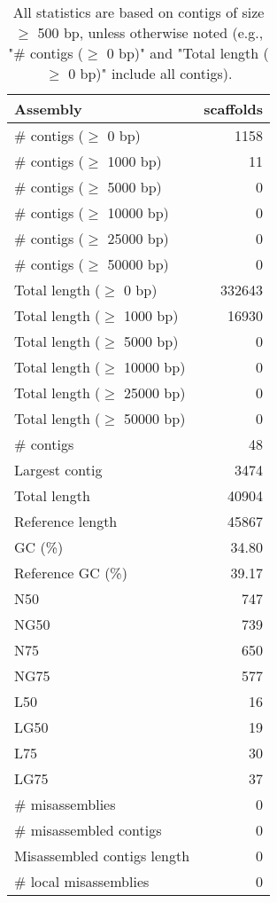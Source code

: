 \documentclass[12pt,a4paper]{article}
\begin{document}
\begin{table}[ht]
\begin{center}
\caption{All statistics are based on contigs of size $\geq$ 500 bp, unless otherwise noted (e.g., "\# contigs ($\geq$ 0 bp)" and "Total length ($\geq$ 0 bp)" include all contigs).}
\begin{tabular}{|l*{1}{|r}|}
\hline
Assembly & scaffolds \\ \hline
\# contigs ($\geq$ 0 bp) & 1158 \\ \hline
\# contigs ($\geq$ 1000 bp) & 11 \\ \hline
\# contigs ($\geq$ 5000 bp) & 0 \\ \hline
\# contigs ($\geq$ 10000 bp) & 0 \\ \hline
\# contigs ($\geq$ 25000 bp) & 0 \\ \hline
\# contigs ($\geq$ 50000 bp) & 0 \\ \hline
Total length ($\geq$ 0 bp) & 332643 \\ \hline
Total length ($\geq$ 1000 bp) & 16930 \\ \hline
Total length ($\geq$ 5000 bp) & 0 \\ \hline
Total length ($\geq$ 10000 bp) & 0 \\ \hline
Total length ($\geq$ 25000 bp) & 0 \\ \hline
Total length ($\geq$ 50000 bp) & 0 \\ \hline
\# contigs & 48 \\ \hline
Largest contig & 3474 \\ \hline
Total length & 40904 \\ \hline
Reference length & 45867 \\ \hline
GC (\%) & 34.80 \\ \hline
Reference GC (\%) & 39.17 \\ \hline
N50 & 747 \\ \hline
NG50 & 739 \\ \hline
N75 & 650 \\ \hline
NG75 & 577 \\ \hline
L50 & 16 \\ \hline
LG50 & 19 \\ \hline
L75 & 30 \\ \hline
LG75 & 37 \\ \hline
\# misassemblies & 0 \\ \hline
\# misassembled contigs & 0 \\ \hline
Misassembled contigs length & 0 \\ \hline
\# local misassemblies & 0 \\ \hline

\end{tabular}
\end{center}
\end{table}
\end{document}
